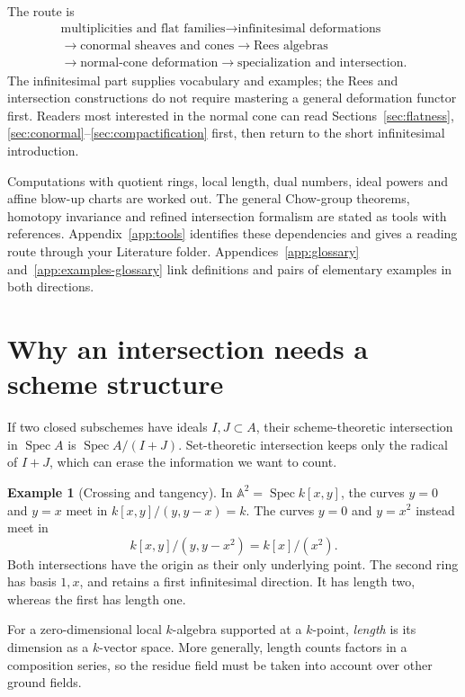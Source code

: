 \documentclass[11pt,a4paper]{article}
\numberwithin{equation}{section}
\theoremstyle{definition}
\newtheorem{example}[definition]{Example}
\newcommand{\A}{\mathbb A}
\newcommand{\Spec}{\operatorname{Spec}}
\begin{document}
The route is
\[
\begin{gathered}
\text{multiplicities and flat families}\longrightarrow
\text{infinitesimal deformations}\\
\longrightarrow\text{conormal sheaves and cones}
\longrightarrow\text{Rees algebras}\\
\longrightarrow\text{normal-cone deformation}
\longrightarrow\text{specialization and intersection}.
\end{gathered}
\]
The infinitesimal part supplies vocabulary and examples; the Rees and
intersection constructions do not require mastering a general
deformation functor first. Readers most interested in the normal cone
can read Sections~\ref{sec:flatness}, \ref{sec:conormal}--\ref{sec:compactification}
first, then return to the short infinitesimal introduction.

Computations with quotient rings, local length, dual numbers, ideal
powers and affine blow-up charts are worked out. The general Chow-group
theorems, homotopy invariance and refined intersection formalism are
stated as tools with references. Appendix~\ref{app:tools} identifies these
dependencies and gives a reading route through your Literature folder.
Appendices~\ref{app:glossary} and~\ref{app:examples-glossary} link
definitions and pairs of elementary examples in both directions.

\section{Why an intersection needs a scheme structure}
\label{sec:multiplicity}

If two closed subschemes have ideals $I,J\subset A$, their
scheme-theoretic intersection in $\Spec A$ is $\Spec A/(I+J)$.
Set-theoretic intersection keeps only the radical of $I+J$, which can
erase the information we want to count.

\begin{example}[Crossing and tangency]
In $\A^2=\Spec k[x,y]$, the curves $y=0$ and $y=x$ meet in
$k[x,y]/(y,y-x)=k$. The curves $y=0$ and $y=x^2$ instead meet in
\[
k[x,y]/(y,y-x^2)=k[x]/(x^2).
\]
Both intersections have the origin as their only underlying point.
The second ring has basis $1,x$, and retains a first infinitesimal
direction. It has length two, whereas the first has length one.
\end{example}

For a zero-dimensional local $k$-algebra supported at a $k$-point,
\emph{length} is its dimension as a $k$-vector space. More generally,
length counts factors in a composition series, so the residue field
must be taken into account over other ground fields.
\end{document}
